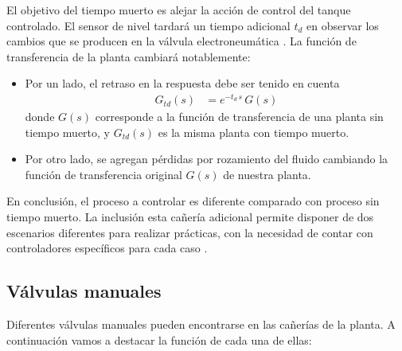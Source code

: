 El objetivo del tiempo muerto es alejar la acción de control del tanque
controlado.
El sensor de nivel tardará un tiempo adicional $t_d$ en observar los cambios
que se producen en la válvula electroneumática \cite{bib:ApuntesPuglesiTema2}.
La función de transferencia de la planta cambiará notablemente:
\begin{itemize}
 \item Por un lado, el retraso en la respuesta debe ser tenido en cuenta
 \begin{align}
  G_{td}(s) &= e^{-t_d\,s}\,G(s)
 \end{align}
 donde $G(s)$ corresponde a la función de transferencia de una planta sin
 tiempo muerto, y $G_{td}(s)$ es la misma planta con tiempo muerto.
  \item Por otro lado, se agregan pérdidas por rozamiento del
  fluido cambiando la función de transferencia original $G(s)$ de nuestra
  planta.
\end{itemize}
En conclusión, el proceso a controlar es diferente comparado con proceso sin
tiempo muerto.
La inclusión esta cañería adicional permite disponer de dos escenarios
diferentes para realizar prácticas, con la necesidad de contar con
controladores específicos para cada caso \cite{bib:ApuntesPuglesiTema2}.

\subsection{Válvulas manuales}

Diferentes válvulas manuales pueden encontrarse en las cañerías de la planta.
A continuación vamos a destacar la función de cada una de ellas:

